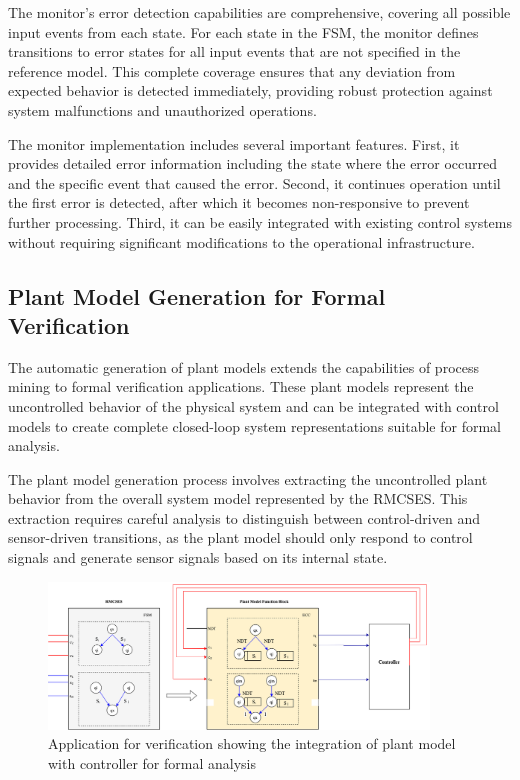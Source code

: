 The monitor's error detection capabilities are comprehensive, covering all possible input events from each state. For each state in the FSM, the monitor defines transitions to error states for all input events that are not specified in the reference model. This complete coverage ensures that any deviation from expected behavior is detected immediately, providing robust protection against system malfunctions and unauthorized operations.

The monitor implementation includes several important features. First, it provides detailed error information including the state where the error occurred and the specific event that caused the error. Second, it continues operation until the first error is detected, after which it becomes non-responsive to prevent further processing. Third, it can be easily integrated with existing control systems without requiring significant modifications to the operational infrastructure.

\subsection{Plant Model Generation for Formal Verification}

The automatic generation of plant models extends the capabilities of process mining to formal verification applications. These plant models represent the uncontrolled behavior of the physical system and can be integrated with control models to create complete closed-loop system representations suitable for formal analysis.

The plant model generation process involves extracting the uncontrolled plant behavior from the overall system model represented by the RMCSES. This extraction requires careful analysis to distinguish between control-driven and sensor-driven transitions, as the plant model should only respond to control signals and generate sensor signals based on its internal state.

\begin{figure}[h]
    \centering
    \includegraphics[width=0.9\textwidth]{MX_Papers/Paper7/images/VerificationApp1.png}
    \caption{Application for verification showing the integration of plant model with controller for formal analysis}
    \label{fig:verification_app}
\end{figure}

